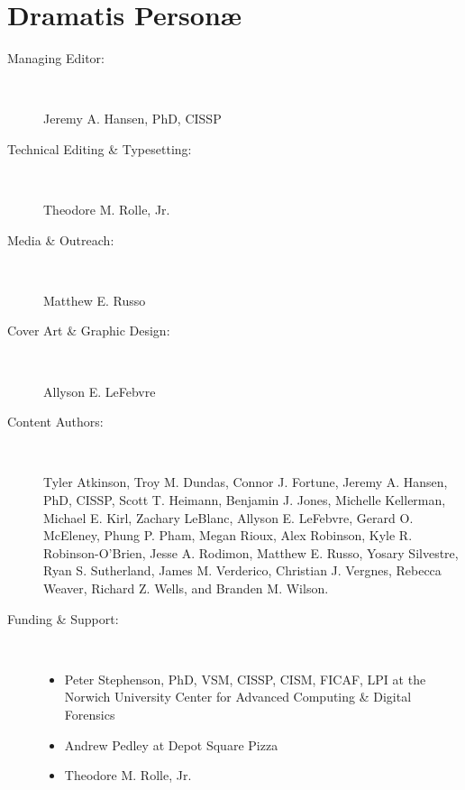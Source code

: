 \documentclass[11pt,final]{book}
\newcommand{\Comment}[1]      {}
\begin{document}


   \chapter*{Dramatis Person\ae}

 \begin{description}

 \item[Managing Editor:] ~
 
 Jeremy A. Hansen, PhD, CISSP

 \item[Technical Editing \& Typesetting:] ~
 
 Theodore M. Rolle, Jr.

 \item[Media \& Outreach:] ~
 
 Matthew E. Russo

 \item[Cover Art \& Graphic Design:] ~
 
 Allyson E. LeFebvre

 \item[Content Authors:]\label{ContentAuthors} ~
 
Tyler Atkinson,
Troy M. Dundas,
Connor J. Fortune,
Jeremy A. Hansen, PhD, CISSP,
Scott T. Heimann,
Benjamin J. Jones,
Michelle Kellerman,
Michael E. Kirl,
Zachary LeBlanc,
Allyson E. LeFebvre,
Gerard O. McEleney,
Phung P. Pham,
Megan Rioux,
Alex Robinson,
Kyle R. Robinson-O'Brien,
Jesse A. Rodimon,
Matthew E. Russo,
Yosary Silvestre,
Ryan S. Sutherland,
James M. Verderico,
Christian J. Vergnes,
Rebecca Weaver,
Richard Z. Wells, and
Branden M. Wilson.

 \item[Funding \& Support:] ~
 
\begin{itemize}
	\item Peter Stephenson, PhD, VSM, CISSP, CISM, FICAF, LPI at the Norwich University Center for Advanced Computing \& Digital Forensics
  \item Andrew Pedley at Depot Square Pizza
  \item Theodore M. Rolle, Jr.
\end{itemize}


\end{description}
\end{document}
